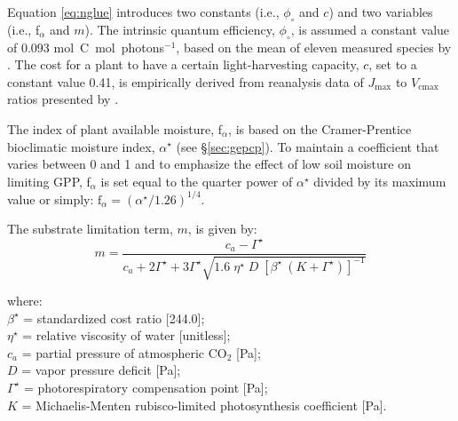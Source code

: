 Equation \ref{eq:nglue} introduces two constants (i.e., $\phi_{\circ}$ and $c$) and two variables (i.e., f$_\alpha$ and $m$).
The intrinsic quantum efficiency, $\phi_{\circ}$, is assumed a constant value of 0.093 mol~C~mol~photons$^{-1}$, based on the mean of eleven measured species by \cite{long93}. 
The cost for a plant to have a certain light-harvesting capacity, $c$, set to a constant value 0.41, is empirically derived from reanalysis data of $J_\text{max}$ to $V_\text{cmax}$ ratios presented by \cite{kattge07}.

The index of plant available moisture, f$_\alpha$, is based on the Cramer-Prentice bioclimatic moisture index, $\alpha^\star$ (see \S \ref{sec:gepcp}). 
To maintain a coefficient that varies between 0 and 1 and to emphasize the effect of low soil moisture on limiting GPP, f$_\alpha$ is set equal to the quarter power of $\alpha^\star$ divided by its maximum value or simply: 
$\text{f}_\alpha = \left(\alpha^\star/1.26\right)^{1/4}$.

The substrate limitation term, $m$, is given by:
%
\begin{equation}
\label{eq:m}
    m = \frac{c_a - \Gamma^\star}
             {c_a 
              + 2 \Gamma^\star 
              + 3 \Gamma^\star \sqrt{
                1.6\; \eta^\star\; D\; \left[
                  \beta^\star\: \left(K + \Gamma^\star\right)
                \right]^{-1}
              }
             }
\end{equation}

\noindent where:\\
\indent $\beta^\star$ = standardized cost ratio [244.0];\\
\indent $\eta^\star$ = relative viscosity of water [unitless];\\
\indent $c_a$ = partial pressure of atmospheric CO$_2$ [Pa];\\
\indent $D$ = vapor pressure deficit [Pa];\\
\indent $\Gamma^\star$ = photorespiratory compensation point [Pa];\\
\indent $K$ = Michaelis-Menten rubisco-limited photosynthesis coefficient [Pa].\\


